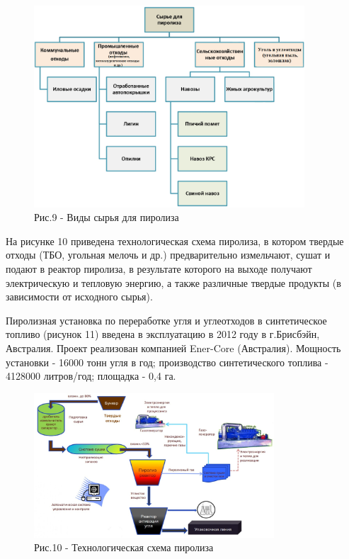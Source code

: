 \begin{figure}[H]
	\centering
	\includegraphics[width=0.9\textwidth]{media/chem2/image72}
	\caption*{Рис.9 - Виды сырья для пиролиза}
\end{figure}

\begin{multicols}{2}
На рисунке 10 приведена технологическая схема пиролиза, в котором
твердые отходы (ТБО, угольная мелочь и др.) предварительно измельчают,
сушат и подают в реактор пиролиза, в результате которого на выходе
получают электрическую и тепловую энергию, а также различные твердые
продукты (в зависимости от исходного сырья).

Пиролизная установка по переработке угля и углеотходов в синтетическое
топливо (рисунок 11) введена в эксплуатацию в 2012 году в г.Брисбэйн,
Австралия. Проект реализован компанией Ener-Core (Австралия). Мощность
установки - 16000 тонн угля в год; производство синтетического топлива -
4128000 литров/год; площадка - 0,4 га.
\end{multicols}

\begin{figure}[H]
	\centering
	\includegraphics[width=0.8\textwidth]{media/chem2/image73}
	\caption*{Рис.10 - Технологическая схема пиролиза}
\end{figure}

